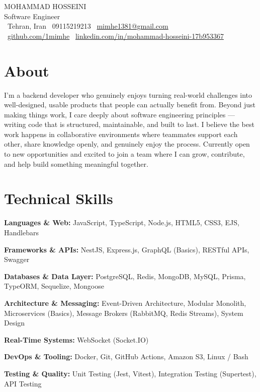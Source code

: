 \documentclass[a4paper,10pt]{article}
\newcommand{\namefont}{\addfontfeatures{LetterSpace=6.0}}
\newcommand{\namefont}{}
\newcommand{\skillcategory}[2]{%
  \noindent\textbf{#1:} #2\par\vspace{2.5pt}%
}
\begin{document}
\begin{center}
  {\fontsize{21pt}{25pt}\selectfont\namefont\color{primary} MOHAMMAD HOSSEINI}\\[5pt]
  {\large\color{accent} Software Engineer}\\[8pt]
  {\small
    \faMapMarker*\ Tehran, Iran \quad\textbar\quad
    \faPhone\ 09115219213 \quad\textbar\quad
    \faEnvelope\ \href{mailto:mimhe1381@gmail.com}{mimhe1381@gmail.com}\\[3pt]
    \faGithub\ \href{https://github.com/1mimhe}{github.com/1mimhe} \quad\textbar\quad
    \faLinkedin\ \href{https://www.linkedin.com/in/mohammad-hosseini-17b953367/}{linkedin.com/in/mohammad-hosseini-17b953367}
  }
\end{center}

\vspace{-4pt}

\section{About}

I'm a backend developer who genuinely enjoys turning real-world challenges into well-designed, usable products that people can actually benefit from. Beyond just making things work, I care deeply about software engineering principles --- writing code that is structured, maintainable, and built to last. I believe the best work happens in collaborative environments where teammates support each other, share knowledge openly, and genuinely enjoy the process. Currently open to new opportunities and excited to join a team where I can grow, contribute, and help build something meaningful together.

\section{Technical Skills}
\skillcategory{Languages \& Web}{JavaScript, TypeScript, Node.js, HTML5, CSS3, EJS, Handlebars}
\skillcategory{Frameworks \& APIs}{NestJS, Express.js, GraphQL (Basics), RESTful APIs, Swagger}
\skillcategory{Databases \& Data Layer}{PostgreSQL, Redis, MongoDB, MySQL, Prisma, TypeORM, Sequelize, Mongoose}
\skillcategory{Architecture \& Messaging}{Event-Driven Architecture, Modular Monolith, Microservices (Basics), Message Brokers (RabbitMQ, Redis Streams), System Design}
\skillcategory{Real-Time Systems}{WebSocket (Socket.IO)}
\skillcategory{DevOps \& Tooling}{Docker, Git, GitHub Actions, Amazon S3, Linux / Bash}
\skillcategory{Testing \& Quality}{Unit Testing (Jest, Vitest), Integration Testing (Supertest), API Testing}
\end{document}
